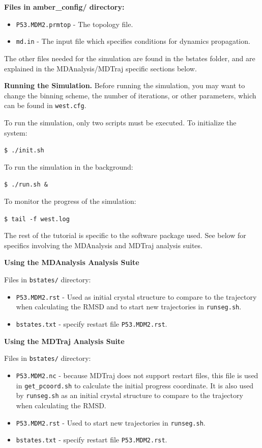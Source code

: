 \documentclass[9pt,tutorial,ASAPversion]{livecoms}
\begin{document}
\textbf{Files in amber\_config/ directory:}
\begin{itemize} 
\item \verb|P53.MDM2.prmtop| - The topology file.
\item \verb|md.in| - The input file which specifies conditions for dynamics propagation.
\end{itemize}

The other files needed for the simulation are found in the bstates folder, and are explained in the MDAnalysis/MDTraj specific sections below.

\textbf{Running the Simulation.} Before running the simulation, you may want to change the binning scheme, the number of iterations, or other parameters, which can be found in \verb|west.cfg|.

To run the simulation, only two scripts must be executed. To initialize the system:

\verb|$ ./init.sh|

To run the simulation in the background:

\verb|$ ./run.sh &|

To monitor the progress of the simulation:

\verb|$ tail -f west.log|

The rest of the tutorial is specific to the software package used. 
See below for specifics involving the MDAnalysis and MDTraj analysis suites.

\textbf{Using the MDAnalysis Analysis Suite}

Files in \verb|bstates/| directory:
\begin{itemize}
\item \verb|P53.MDM2.rst| - Used as initial crystal structure to compare to the trajectory when calculating the RMSD and to start new trajectories in \verb|runseg.sh|.
\item \verb|bstates.txt| - specify restart file \verb|P53.MDM2.rst|.
\end{itemize}

\textbf{Using the MDTraj Analysis Suite}

Files in \verb|bstates/| directory:
\begin{itemize}
\item \verb|P53.MDM2.nc| - because MDTraj does not support restart files, this file is used in \verb|get_pcoord.sh| to calculate the initial progress coordinate. 
It is also used by \verb|runseg.sh| as an initial crystal structure to compare to the trajectory when calculating the RMSD.
\item \verb|P53.MDM2.rst| - Used to start new trajectories in \verb|runseg.sh|.
\item \verb|bstates.txt| - specify restart file \verb|P53.MDM2.rst|.
\end{itemize}
\end{document}
